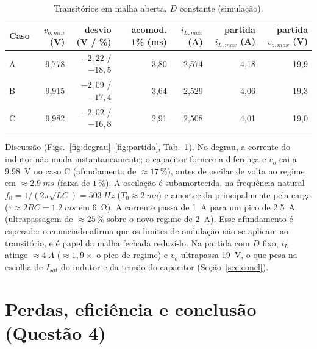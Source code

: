 \documentclass[11pt,a4paper]{article}
\begin{document}
\begin{table}[h]
\centering
\caption{Transit\'orios em malha aberta, $D$ constante (simula\c{c}\~ao).}
\label{tab:trans}
\small
\setlength{\tabcolsep}{3.5pt}
\begin{tabular}{@{}lrrrrrr@{}}
\toprule
Caso & $v_{o,min}$ (V) & desvio (V / \%) & acomod. 1\% (ms) & $i_{L,max}$ (A) & partida $i_{L,max}$ (A) & partida $v_{o,max}$ (V) \\ \midrule
A & 9,778 & $-2{,}22$ / $-18{,}5$ & 3,80 & 2,574 & 4,18 & 19,9 \\
B & 9,915 & $-2{,}09$ / $-17{,}4$ & 3,64 & 2,529 & 4,06 & 19,3 \\
C & 9,982 & $-2{,}02$ / $-16{,}8$ & 2,91 & 2,508 & 4,01 & 19,0 \\ \bottomrule
\end{tabular}
\end{table}

Discuss\~ao (Figs.~\ref{fig:degrau}--\ref{fig:partida}, Tab.~\ref{tab:trans}). No degrau, a corrente do indutor n\~ao muda instantaneamente; o capacitor fornece a diferen\c{c}a e $v_o$ cai a \SI{9,98}{V} no caso C (afundamento de $\approx17\,\%$), antes de oscilar de volta ao regime em $\approx\SI{2,9}{ms}$ (faixa de $1\,\%$). A oscila\c{c}\~ao \'e subamortecida, na frequ\^encia natural $f_0=1/(2\pi\sqrt{LC})=\SI{503}{Hz}$ ($T_0\approx\SI{2}{ms}$) e amortecida principalmente pela carga ($\tau\approx2RC=\SI{1,2}{ms}$ em \SI{6}{\ohm}). A corrente passa de \SI{1}{A} para um pico de \SI{2,5}{A} (ultrapassagem de $\approx25\,\%$ sobre o novo regime de \SI{2}{A}). Esse afundamento \'e esperado: o enunciado afirma que os limites de ondula\c{c}\~ao n\~ao se aplicam ao transit\'orio, e \'e papel da malha fechada reduz\'i-lo. Na partida com $D$ fixo, $i_L$ atinge $\approx\SI{4}{A}$ ($\approx1{,}9\times$ o pico de regime) e $v_o$ ultrapassa \SI{19}{V}, o que pesa na escolha de $I_{sat}$ do indutor e da tens\~ao do capacitor (Se\c{c}\~ao~\ref{sec:concl}).

\section{Perdas, efici\^encia e conclus\~ao (Quest\~ao 4)}\label{sec:perdas}
\end{document}
